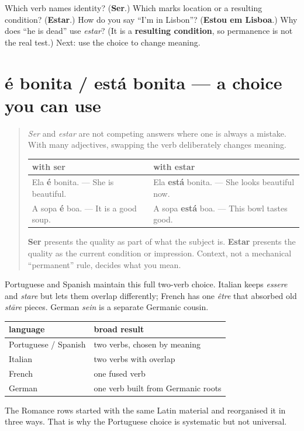 \begin{tcolorbox}[breakable,colback=teal!4,colframe=teal!35!black,title={Before you move on}]
Which verb names identity? (\textbf{Ser}.) Which marks location or a resulting condition? (\textbf{Estar}.) How do you say “I’m in Lisbon”? (\textbf{Estou em Lisboa}.) Why does “he is dead” use \emph{estar}? (It is a \textbf{resulting condition}, so permanence is not the real test.) Next: use the choice to change meaning.
\end{tcolorbox}
\section[é bonita / está bonita]{é bonita / está bonita — a choice you can use}

\label{lesson:PT-C16-ser-estar-meaning}



\begin{quote}
\emph{Ser} and \emph{estar} are not competing answers where one is always a mistake. With many adjectives, swapping the verb deliberately changes meaning.

\noindent
\begin{tabularx}{\linewidth}{@{}>{\raggedright\arraybackslash}X>{\raggedright\arraybackslash}X@{}}
\toprule
\textbf{with ser} & \textbf{with estar} \\
\midrule
Ela \textbf{é} bonita. — She is beautiful. & Ela \textbf{está} bonita. — She looks beautiful now. \\
A sopa \textbf{é} boa. — It is a good soup. & A sopa \textbf{está} boa. — This bowl tastes good. \\
\bottomrule
\end{tabularx}

\textbf{Ser} presents the quality as part of what the subject is. \textbf{Estar} presents the quality as the current condition or impression. Context, not a mechanical “permanent” rule, decides what you mean.
\end{quote}

\begin{cousinweb}
Portuguese and Spanish maintain this full two-verb choice. Italian keeps \emph{essere} and \emph{stare} but lets them overlap differently; French has one \emph{être} that absorbed old \emph{stāre} pieces. German \emph{sein} is a separate Germanic cousin.

\noindent
\begin{tabularx}{\linewidth}{@{}>{\raggedright\arraybackslash}X>{\raggedright\arraybackslash}X@{}}
\toprule
\textbf{language} & \textbf{broad result} \\
\midrule
Portuguese / Spanish & two verbs, chosen by meaning \\
Italian & two verbs with overlap \\
French & one fused verb \\
German & one verb built from Germanic roots \\
\bottomrule
\end{tabularx}

The Romance rows started with the same Latin material and reorganised it in three ways. That is why the Portuguese choice is systematic but not universal.
\end{cousinweb}

